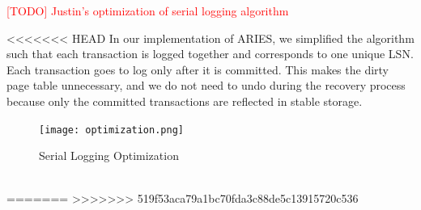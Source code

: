 \textcolor{red}{[TODO] Justin's optimization of serial logging algorithm}

<<<<<<< HEAD
In our implementation of ARIES, we simplified the algorithm such that each transaction is logged together and corresponds to one unique LSN. Each transaction goes to log only after it is committed. This makes the dirty page table unnecessary, and we do not need to undo during the recovery process because only the committed transactions are reflected in stable storage.


\begin{figure}[!h]
  \texttt{[image: optimization.png]}
  \caption{Serial Logging Optimization}
  \label{optimization}
\end{figure}\\
=======
>>>>>>> 519f53aca79a1bc70fda3c88de5c13915720c536
